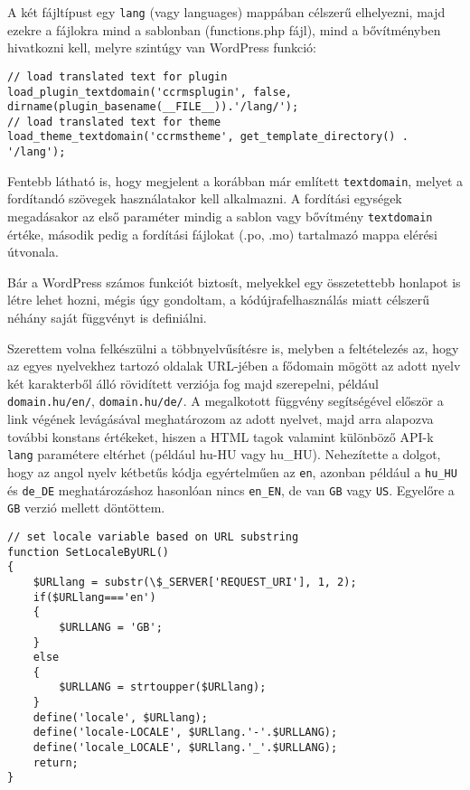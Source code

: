 A két fájltípust egy \texttt{lang} (vagy languages) mappában célszerű elhelyezni, majd ezekre a fájlokra mind a sablonban (functions.php fájl), mind a bővítményben hivatkozni kell, melyre szintúgy van WordPress funkció:

\begin{lstlisting}
// load translated text for plugin
load_plugin_textdomain('ccrmsplugin', false, dirname(plugin_basename(__FILE__)).'/lang/');
// load translated text for theme
load_theme_textdomain('ccrmstheme', get_template_directory() . '/lang');
\end{lstlisting}

Fentebb látható is, hogy megjelent a korábban már említett \verb|textdomain|, melyet a fordítandó szövegek használatakor kell alkalmazni. A fordítási egységek megadásakor az első paraméter mindig a sablon vagy bővítmény \verb|textdomain| értéke, második pedig a fordítási fájlokat (.po, .mo) tartalmazó mappa elérési útvonala.


Bár a WordPress számos funkciót biztosít, melyekkel egy összetettebb honlapot is létre lehet hozni, mégis úgy gondoltam, a kódújrafelhasználás miatt célszerű néhány saját függvényt is definiálni.

Szerettem volna felkészülni a többnyelvűsítésre is, melyben a feltételezés az, hogy az egyes nyelvekhez tartozó oldalak URL-jében a fődomain mögött az adott nyelv két karakterből álló rövidített verziója fog majd szerepelni, például \texttt{domain.hu/en/}, \texttt{domain.hu/de/}. A megalkotott függvény segítségével először a link végének levágásával meghatározom az adott nyelvet, majd arra alapozva további konstans értékeket, hiszen a HTML tagok valamint különböző API-k \verb|lang| paramétere eltérhet (például hu-HU vagy hu\_HU). Nehezítette a dolgot, hogy az angol nyelv kétbetűs kódja egyértelműen az \texttt{en}, azonban például a \texttt{hu\_HU} és \texttt{de\_DE} meghatározáshoz hasonlóan nincs \texttt{en\_EN}, de van \texttt{GB} vagy \texttt{US}. Egyelőre a \texttt{GB} verzió mellett döntöttem.

\begin{lstlisting}
// set locale variable based on URL substring
function SetLocaleByURL()
{
	$URLlang = substr(\$_SERVER['REQUEST_URI'], 1, 2);
	if($URLlang==='en')
	{
		$URLLANG = 'GB';
	}
	else
	{
		$URLLANG = strtoupper($URLlang);
	}
	define('locale', $URLlang);
	define('locale-LOCALE', $URLlang.'-'.$URLLANG);
	define('locale_LOCALE', $URLlang.'_'.$URLLANG);
	return;
}
\end{lstlisting}

